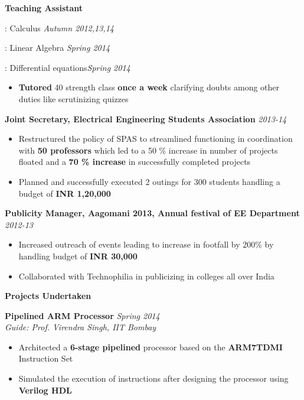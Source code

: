 \documentclass[a4paper,10pt]{article}
\newcommand{\resheading}[1]{
	{\large \colorbox{mygrey}{\begin{minipage}{\textwidth}{\textbf{#1 \vphantom{p\^{E}}}}\end{minipage}}}
}
\newcommand{\ressubheadingWithGuide}[3]{%

	\textbf{#1} \hfill \textit{#2}\null\\
	\textit{\small #3} %
	\vspace{-4pt}
}
\newcommand{\ressubheadingother}[2]{
	\textbf{#1} \hfill \textit{#2}\null
	\vspace{-4pt}
}
\begin{document}
			\ressubheadingother{Teaching Assistant}{}

			\begin{description} [labelindent=*] \itemsep -1pt
					\item[MA 105]: Calculus \hfill \textit{Autumn 2012,13,14}
					\item[MA 106]: Linear Algebra \hfill \textit{Spring 2014}
					\item[MA 108]: Differential equations\hfill \textit{Spring 2014}
				\end{description}
			\vspace{-15pt}
			\begin{itemize}
			\item \textbf{Tutored} 40 strength class \textbf{once a week} clarifying doubts among other duties like scrutinizing quizzes
			\end{itemize}


			\ressubheadingother{Joint Secretary, Electrical Engineering Students Association}{2013-14}
			\begin{itemize} \itemsep -1pt
				\item Restructured the policy of SPAS to streamlined functioning in coordination with \textbf{50 professors} which led to a 50 \% increase in number of projects floated and a \textbf{70 \% increase} in successfully completed projects
				\item Planned and successfully executed 2 outings for 300 students handling a budget of \textbf{INR 1,20,000}
			\end{itemize}

			\ressubheadingother{Publicity Manager, Aagomani 2013, Annual festival of EE Department}{2012-13}
			\begin{itemize}\itemsep -1pt
				\item Increased outreach of events leading to increase in footfall by 200\% by handling budget of \textbf{INR 30,000}  
				\item Collaborated with Technophilia in publicizing in colleges all over India
			\end{itemize}
		
\resheading{Projects Undertaken}
    		\ressubheadingWithGuide{Pipelined ARM Processor}{\textit{Spring 2014}}{Guide: Prof. Virendra Singh, IIT Bombay}
            	\begin{itemize}\itemsep -1pt
            	\item Architected a \textbf{6-stage pipelined} processor based on the \textbf{ARM7TDMI} Instruction Set
				\item Simulated the execution of instructions after designing the processor using \textbf{Verilog HDL}
            	\end{itemize}
\end{document}
